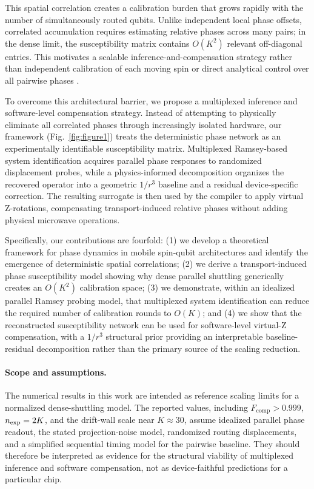 \documentclass[a4paper,twocolumn,11pt]{quantumarticle}
\begin{document}
This spatial correlation creates a calibration burden that grows rapidly with the number of simultaneously routed qubits. Unlike independent local phase offsets, correlated accumulation requires estimating relative phases across many pairs; in the dense limit, the susceptibility matrix contains $O(K^2)$ relevant off-diagonal entries. This motivates a scalable inference-and-compensation strategy rather than independent calibration of each moving spin or direct analytical control over all pairwise phases \cite{tanttu_assessment_2024, proctor_benchmarking_2025, glaser_training_2015}.

To overcome this architectural barrier, we propose a multiplexed inference and software-level compensation strategy. Instead of attempting to physically eliminate all correlated phases through increasingly isolated hardware, our framework (Fig.~\ref{fig:figure1}) treats the deterministic phase network as an experimentally identifiable susceptibility matrix. Multiplexed Ramsey-based system identification \cite{ruffino_cryo-cmos_2022, harper_efficient_2020} acquires parallel phase responses to randomized displacement probes, while a physics-informed decomposition organizes the recovered operator into a geometric $1/r^3$ baseline and a residual device-specific correction. The resulting surrogate is then used by the compiler to apply virtual Z-rotations, compensating transport-induced relative phases without adding physical microwave operations.

Specifically, our contributions are fourfold: 
(1) we develop a theoretical framework for phase dynamics in mobile spin-qubit architectures and identify the emergence of deterministic spatial correlations; 
(2) we derive a transport-induced phase susceptibility model showing why dense parallel shuttling generically creates an $O(K^2)$ calibration space; 
(3) we demonstrate, within an idealized parallel Ramsey probing model, that multiplexed system identification can reduce the required number of calibration rounds to $O(K)$; and 
(4) we show that the reconstructed susceptibility network can be used for software-level virtual-Z compensation, with a $1/r^3$ structural prior providing an interpretable baseline-residual decomposition rather than the primary source of the scaling reduction.

\paragraph{Scope and assumptions.}
The numerical results in this work are intended as reference scaling limits for a normalized dense-shuttling model. The reported values, including $F_{\text{comp}}>0.999$, $n_{\rm exp}=2K$, and the drift-wall scale near $K\approx30$, assume idealized parallel phase readout, the stated projection-noise model, randomized routing displacements, and a simplified sequential timing model for the pairwise baseline. They should therefore be interpreted as evidence for the structural viability of multiplexed inference and software compensation, not as device-faithful predictions for a particular chip.
\end{document}
